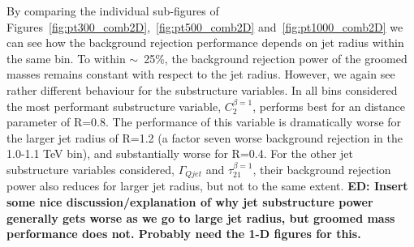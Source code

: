 By comparing the individual sub-figures of Figures~\ref{fig:pt300_comb2D},~\ref{fig:pt500_comb2D}
and~\ref{fig:pt1000_comb2D} we can see how the background rejection
performance depends on jet radius within the same \pt bin. To within
$\sim$~25\%, the background rejection power of the groomed masses remains
constant with respect to the jet radius. However, we again see rather
different behaviour for the substructure variables. In all \pt bins
considered the most performant substructure variable, $C_2^{\beta=1}$,
performs best for an \antikt distance parameter of R=0.8. The
performance of this variable is dramatically worse for the larger jet
radius of R=1.2 (a factor seven worse background rejection in
the 1.0-1.1 TeV bin), and substantially worse for R=0.4. For the other
jet substructure variables considered, $\Gamma_{Qjet}$ and
$\tau_{21}^{\beta=1}$, their background rejection
power also reduces for larger jet radius, but not to the same extent.
{\bf
  ED: Insert some nice discussion/explanation of why jet substructure
  power generally gets worse as we go to large jet radius, but groomed
mass performance does not. Probably need the 1-D figures for this.}

%

